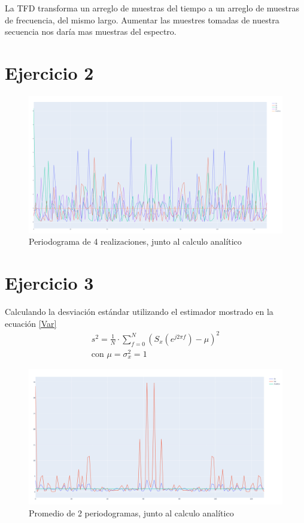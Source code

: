 \documentclass[12pt,letterpaper]{article}     %
\begin{document}
La TFD transforma un arreglo de muestras del tiempo a un arreglo de muestras de frecuencia, del mismo largo.
Aumentar las muestres tomadas de nuestra secuencia nos daría mas muestras del espectro.

\section{Ejercicio 2}

\begin{figure}[!ht]
\centering
\includegraphics[width=18cm]{imagenes/4RealizacionesyAnalitico.png}
\caption{Periodograma de 4 realizaciones, junto al calculo analítico}
\end{figure}

\clearpage
\section{Ejercicio 3}
\label{E3}

Calculando la desviación estándar utilizando el 
estimador mostrado en la ecuación \ref{Var}
\begin{equation}
	\begin{split}
		s^2=
		\frac{1}{N}
		\cdot\sum_{f=0}^{N}
		(S_x(e^{j2\pi f})-\mu)^2\\
		\text{con }\mu=\sigma_x^2=1
	\end{split}
	\label{Var}
\end{equation}

\begin{figure}[!ht]
\centering
\includegraphics[width=18cm]{imagenes/PromedioN2.png}
\caption{Promedio de 2 periodogramas, junto al calculo analítico}
\end{figure}
\end{document}
